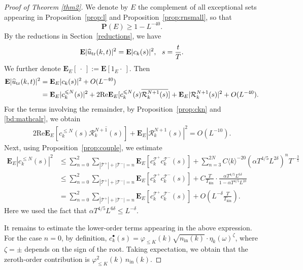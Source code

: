 \documentclass[UTF-8,reqno]{amsart}
\numberwithin{equation}{section}
\theoremstyle{definition}
\def\geq{\geqslant}
\def\leq{\leqslant}
\def\geq{\geqslant}
\def\leq{\leqslant}
\begin{document}
\begin{proof}[Proof of Theorem \ref{thm2}]
We denote by $E$ the complement of all exceptional sets appearing in Proposition~\ref{prop:l} and Proposition~\ref{prop:rnsmall}, so that
     $$\mathbf{P}(E) \geq  1-L^{-40}.$$
 By the reductions in Section~\ref{reductions}, we have
 $$\mathbf{E}|\widehat{u}_{\rm tr}(k,t)|^2=\mathbf{E}|c_k(s)|^2,\ \ s = \frac tT.$$
 We further denote $\mathbf{E}_E[\ \cdot\ ]:=\mathbf{E}[ 1_E\cdot\ ]$. Then
 \begin{align*}
  \mathbf E|\widehat u_{\rm tr}(k, t)|^2&=   \mathbf{E}_E |c_k(s)|^2+O(L^{-40}) \\
  &=\mathbf{E}_E| c^{\leq N}_k (s)|^2 +2\mathrm{Re}\mathbf{E} _E[c^{\leq N}_ k (s)\overline{\mathcal{R}^{N+1}_k (s)}] +\mathbf{E}_E |\mathcal{R}^{N+1}_k (s)|^2+O(L^{-40}) .
 \end{align*}
 For the terms involving the remainder, by Proposition~\ref{prop:ckn} and \eqref{bd:mathcalr}, we obtain
 \begin{align*}
     2\mathrm{Re}\mathbf{E} _E[c^{\leq N}_ k (s)\overline{\mathcal{R}^{N+1}_k (s)}] +\mathbf{E}_E |\mathcal{R}^{N+1}_k (s)|^2=O(L^{-10}). 
 \end{align*}
Next, using Proposition~\ref{prop:couple}, we estimate
\begin{align*}
    \mathbf{E}_E| c^{\leq N}_k (s)|^2%
    &\leq \sum_{n=0}^{2}\sum_{|\mathcal{T}^+|+|\mathcal{T}^-|=n}\mathbf{E}_E[c^{\mathcal{T}^+}_kc^{\mathcal{T}^-}_k(s)]+\sum_{n=3}^{2N} C \langle k\rangle^{-20}  (\alpha  T^{4/5}  L^{2\delta})^nT^{- \frac{3}{5}}\\
    &\leq \sum_{n=0}^{2}\sum_{|\mathcal{T}^+|+|\mathcal{T}^-|=n}\mathbf{E}_E[c^{\mathcal{T}^+}_kc^{\mathcal{T}^-}_k(s)]+C\frac{T}{T_{\mathrm{kin}}} \cdot\frac{\alpha  T^{4/5}  L^{6\delta}}{1-\alpha  T^{4/5}  L^{2\delta}}\\
    &=\sum_{n=0}^{2}\sum_{|\mathcal{T}^+|+|\mathcal{T}^-|=n}\mathbf{E}_E[c^{\mathcal{T}^+}_kc^{\mathcal{T}^-}_k(s)]+O(L^{-\delta}\frac{T}{T_{\mathrm{kin}}}).
\end{align*}
Here we used the fact that $\alpha  T^{4/5}  L^{6\delta}\leq L^{-\delta}.$

It remains to estimate the lower-order terms appearing in the above expression.
For the case $n=0$, by definition,   $c_k^{\bullet}(s)= \varphi_{\leq K}(k)\sqrt{n_{\mathrm{in}}(k)}\cdot\eta_k(\omega)^\zeta$, where $\zeta=\pm$ depends on the sign of the root.
Taking expectation, we obtain that the zeroth-order contribution is  $\varphi_{\leq K}^2(k)\, n_{\mathrm{in}}(k)$.


\end{proof}
\end{document}
